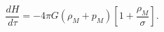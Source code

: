 \begin{equation}
\frac{dH}{d\tau} = -4\pi G (\rho_M + p_M)\left[ 1+ \frac{\rho_M}{\sigma}
\right].
\end{equation}

